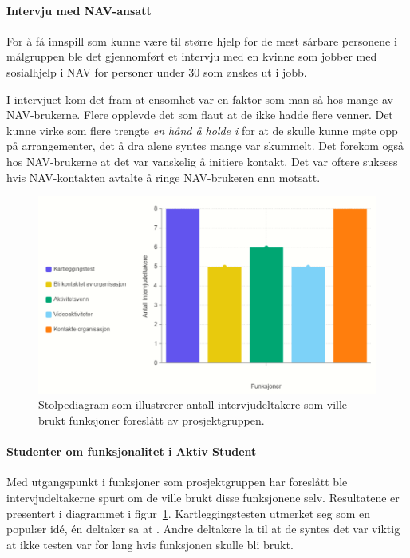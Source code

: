 \paragraph{Intervju med NAV-ansatt}
For å få innspill som kunne være til større hjelp for de mest sårbare personene i målgruppen ble det gjennomført et intervju med en kvinne som jobber med sosialhjelp i NAV for personer under 30 som ønskes ut i jobb. 

\vspace{5mm} %

I intervjuet kom det fram at ensomhet var en faktor som man så hos mange av NAV-brukerne. Flere opplevde det som flaut at de ikke hadde flere venner. Det kunne virke som flere trengte {\em  en hånd å holde i} for at de skulle kunne møte opp på arrangementer, det å dra alene syntes mange var skummelt. Det forekom også hos NAV-brukerne at det var vanskelig å initiere kontakt. Det var oftere suksess hvis NAV-kontakten avtalte å ringe NAV-brukeren enn motsatt.


\begin{figure}[H]
\includegraphics[width=\textwidth]{Illustrasjoner/diagram-funksjoner.png}
\caption{Stolpediagram som illustrerer antall intervjudeltakere som ville brukt funksjoner foreslått av prosjektgruppen.}
\label{fig:diagram-funksjoner}
\end{figure}

\paragraph{Studenter om funksjonalitet i Aktiv Student}

Med utgangspunkt i funksjoner som prosjektgruppen har foreslått ble intervjudeltakerne spurt om de ville brukt disse funksjonene selv. Resultatene er presentert i diagrammet i figur~\ref{fig:diagram-funksjoner}. Kartleggingstesten utmerket seg som en populær idé, én deltaker sa at . Andre deltakere la til at de syntes det var viktig at ikke testen var for lang hvis funksjonen skulle bli brukt.

